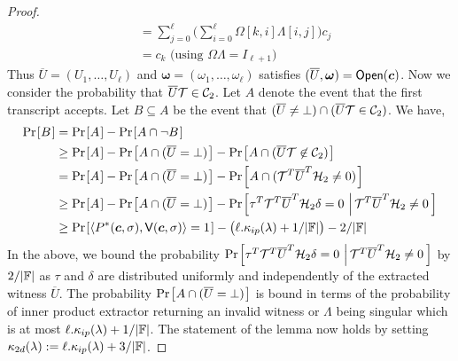 \begin{proof}
\begin{align*}
	&= \sum_{j=0}^{\ell}\big(\sum_{i=0}^{\ell}\Omega[k,i]\Lambda[i,j]\big)c_j
\\
	&= c_k \text{ (using $\Omega\Lambda=I_{\ell+1})$ }
\end{align*}
Thus $\overline{U}=(U_1,\ldots,U_{\ell})$ and $\bm{\omega}=(\omega_1,\ldots,\omega_{\ell})$ satisfies $(\overline{U},\bm{\omega})=\mathsf{Open}(\bm{c})$. Now we
consider the probability that $\overline{U}\mathcal{T}\in \mathcal{C}_2$. Let $A$ denote the event
that the first transcript accepts. Let $B\subseteq A$ be the event that
$(\overline{U}\neq\bot)\cap (\overline{U}\mathcal{T}\in \mathcal{C}_2)$. We have,
\begin{align*}
\prob{B} &= \prob{A} - \prob{A\cap \neg B} \\
	&\geq \prob{A} - \prob{A\cap (\overline{U}=\bot)} - \prob{A\cap
(\overline{U}\mc{T}\not\in \mc{C}_2)} \\
	&= \prob{A} - \prob{A\cap (\overline{U}=\bot)} - \prob{A\cap
(\mc{T}^T\overline{U}^T\mc{H}_2\neq 0)} \\
	&\geq \prob{A} - \prob{A\cap (\overline{U}=\bot)} -
\condprob{\tau^T\mc{T}^T\overline{U}^T\mc{H}_2\delta=
0}{\mc{T}^T\overline{U}^T\mc{H}_2\neq 0} \\
	&\geq \prob{\langle P^\ast(\bm{c},\sigma),\verifier(\bm{c},\sigma)\rangle=1}
- \big(\ell.\kappa_{ip}(\secpar)+1/|\FF|\big) - 2/|\FF|
\end{align*} 
In the above, we bound the probability $\condprob{\tau^T\mc{T}^T\overline{U}^T\mc{H}_2\delta=
0}{\mc{T}^T\overline{U}^T\mc{H}_2\neq 0}$ by $2/|\mathbb{F}|$ as $\tau$ and $\delta$ are
distributed uniformly and independently of the extracted witness $\overline{U}$. The
probability $\prob{A\cap (\overline{U}=\bot)}$ is bound in terms of the probability
of inner product extractor returning an invalid witness or $\Lambda$ being
singular which is at most $\ell.\kappa_{ip}(\lambda)+1/|\mathbb{F}|$. The
statement of the lemma now holds by setting
$\kappa_{2d}(\lambda):=\ell.\kappa_{ip}(\lambda) + 3/|\mathbb{F}|$.
\end{proof}

